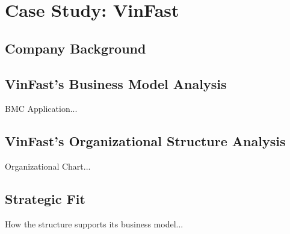 \chapter{Case Study: VinFast}
\label{chap:vinfast}

\section{Company Background}

\section{VinFast's Business Model Analysis}

BMC Application...

\section{VinFast's Organizational Structure Analysis}

Organizational Chart...

\section{Strategic Fit}

How the structure supports its business model...
